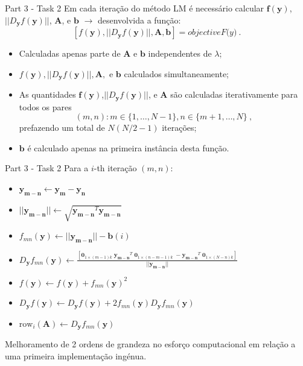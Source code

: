 \documentclass{beamer}					%
\begin{document}
\begin{frame}{Part 3 - Task 2}
	Em cada iteração do método LM é necessário calcular $\mathbf{f}(\mathbf{y})$,$||D_{\mathbf{y}}f(\mathbf{y})||$, $\mathbf{A}$, e $\mathbf{b}$ $\rightarrow$ desenvolvida a função:
	\begin{equation*}\label{key}
	[f(\mathbf{y}),||D_{\mathbf{y}}f(\mathbf{y})||,\mathbf{A},\mathbf{b}] = \textit{objectiveF(y)}\:.\end{equation*}
	\begin{itemize}
		\item Calculadas apenas parte de $\mathbf{A}$ e $\mathbf{b}$ independentes de $\lambda$;
		\item $f(\mathbf{y}),||D_{\mathbf{y}}f(\mathbf{y})||,\mathbf{A},$ e $\mathbf{b}$ calculados simultaneamente;
		\item As quantidades $\mathbf{f}(\mathbf{y})$,$||D_{\mathbf{y}}f(\mathbf{y})||$, e $\mathbf{A}$ são calculadas iterativamente para todos os pares 
		\begin{equation*}\label{key}
		(m,n):m\in \{1,\ldots,N-1\}, n \in \{m+1,\ldots,N\}\:,
		\end{equation*}
		prefazendo um total de $N(N/2-1)$ iterações;
		\item $\mathbf{b}$ é calculado apenas na primeira instância desta função.
	\end{itemize}

\end{frame}

\begin{frame}{Part 3 - Task 2}
	Para a $i$-th iteração $(m,n)$:
	\begin{itemize}
		\item $\mathbf{y_{m-n}} \leftarrow \mathbf{y_m}-\mathbf{y_n}$
		\item $||\mathbf{y_{m-n}}|| \leftarrow \sqrt{\mathbf{y_{m-n}}^T\mathbf{y_{m-n}}}$
		\item $f_{mn}(\mathbf{y}) \leftarrow ||\mathbf{y_{m-n}}||-\mathbf{b}(i)$
		\item $ D_{\mathbf{y}}f_{mn}(\mathbf{y}) \leftarrow \frac{\left[\mathbf{0}_{1\times(m-1)k} \;  \mathbf{y_{m-n}}^T \; \mathbf{0}_{1\times(n-m-1)k} \; -\mathbf{y_{m-n}}^T \; \mathbf{0}_{1\times(N-n)k}  \right]}{||\mathbf{y_{m-n}}||}$
		\item $f(\mathbf{y}) \leftarrow f(\mathbf{y})+f_{mn}(\mathbf{y})^2$
		\item $D_{\mathbf{y}}f(\mathbf{y}) \leftarrow D_{\mathbf{y}}f(\mathbf{y})+2f_{mn}(\mathbf{y})D_{\mathbf{y}}f_{mn}(\mathbf{y})$
		\item $\mathrm{row}_i(\mathbf{A})\leftarrow D_{\mathbf{y}}f_{mn}(\mathbf{y})$
	\end{itemize}
\phantom{.}

Melhoramento de 2 ordens de grandeza no esforço computacional em relação a uma primeira implementação ingénua.
\end{frame}
\end{document}
